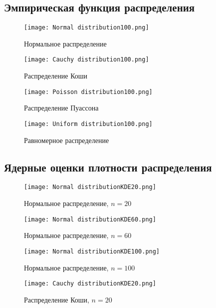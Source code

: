 \documentclass[a4paper]{article}
\begin{document}
\subsection{Эмпирическая функция распределения}
\begin{figure}[H]
	\centering
	{\texttt{[image: Normal distribution100.png]}}
		\caption{Нормальное распределение} 
		\label{fig:normal}
\end{figure}

\begin{figure}[H]
	{\texttt{[image: Cauchy distribution100.png]}}
		\caption{Распределение Коши} 
		\label{fig:normal}
	\end{figure}

\begin{figure}[H]
	{\texttt{[image: Poisson distribution100.png]}}
		\caption{Распределение Пуассона} 
		\label{fig:normal}
	\end{figure}
	
\begin{figure}[H]
	{\texttt{[image: Uniform distribution100.png]}}
		\caption{Равномерное распределение} 
		\label{fig:normal}
	\end{figure}
	
\subsection{Ядерные оценки плотности распределения}
\begin{figure}[H]
	{\texttt{[image: Normal distributionKDE20.png]}}
		\caption{Нормальное распределение, $n=20$} 
		\label{fig:normal}
	\end{figure}
	
\begin{figure}[H]
	{\texttt{[image: Normal distributionKDE60.png]}}
		\caption{Нормальное распределение, $n=60$} 
		\label{fig:normal}
	\end{figure}
		
\begin{figure}[H]
	{\texttt{[image: Normal distributionKDE100.png]}}
		\caption{Нормальное распределение, $n=100$} 
		\label{fig:normal}
	\end{figure}

\begin{figure}[H]
	{\texttt{[image: Cauchy distributionKDE20.png]}}
		\caption{Распределение Коши, $n=20$} 
		\label{fig:normal}
	\end{figure}
	
\end{document}
